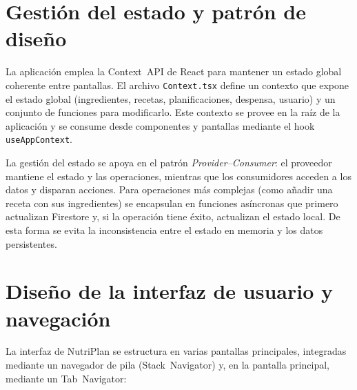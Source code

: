 \documentclass[twoside, openright, 11pt]{report}
\begin{document}
\section{Gestión del estado y patrón de diseño}
La aplicación emplea la Context API de React para mantener un estado global coherente entre pantallas. El archivo \texttt{Context.tsx} define un contexto que expone el estado global (ingredientes, recetas, planificaciones, despensa, usuario) y un conjunto de funciones para modificarlo. Este contexto se provee en la raíz de la aplicación y se consume desde componentes y pantallas mediante el hook \texttt{useAppContext}. 

La gestión del estado se apoya en el patrón \emph{Provider–Consumer}: el proveedor mantiene el estado y las operaciones, mientras que los consumidores acceden a los datos y disparan acciones. Para operaciones más complejas (como añadir una receta con sus ingredientes) se encapsulan en funciones asíncronas que primero actualizan Firestore y, si la operación tiene éxito, actualizan el estado local. De esta forma se evita la inconsistencia entre el estado en memoria y los datos persistentes.

\section{Diseño de la interfaz de usuario y navegación}
La interfaz de NutriPlan se estructura en varias pantallas principales, integradas mediante un navegador de pila (Stack Navigator) y, en la pantalla principal, mediante un Tab Navigator:
\end{document}

